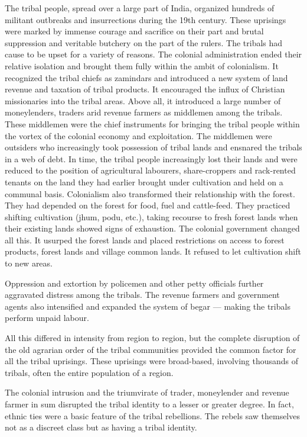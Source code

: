 The tribal people, spread over a large part of India, organized hundreds of militant outbreaks and insurrections during the 19th century. These uprisings were marked by immense courage and sacrifice on their part and brutal suppression and veritable butchery on the part of the rulers. The tribals had cause to be upset for a variety of reasons. The colonial administration ended their relative isolation and brought them fully within the ambit of colonialism. It recognized the tribal chiefs as zamindars and introduced a new system of land revenue and taxation of tribal products. It encouraged the influx of Christian missionaries into the tribal areas. Above all, it introduced a large number of moneylenders, traders arid revenue farmers as middlemen among the tribals. These middlemen were the chief instruments for bringing the tribal people within the vortex of the colonial economy and exploitation. The middlemen were outsiders who increasingly took possession of tribal lands and ensnared the tribals in a web of debt. In time, the tribal people increasingly lost their lands and were reduced to the position of agricultural labourers, share-croppers and rack-rented tenants on the land they had earlier brought under cultivation and held on a communal basis. Colonialism also transformed their relationship with the forest. They had depended on the forest for food, fuel and cattle-feed. They practiced shifting cultivation (jhum, podu, etc.), taking recourse to fresh forest lands when their existing lands showed signs of exhaustion. The colonial government changed all this. It usurped the forest lands and placed restrictions on access to forest products, forest lands and village common lands. It refused to let cultivation shift to new areas.

Oppression and extortion by policemen and other petty officials further aggravated distress among the tribals. The revenue farmers and government agents also intensified and expanded the system of begar — making the tribals perform unpaid labour.

All this differed in intensity from region to region, but the complete disruption of the old agrarian order of the tribal communities provided the common factor for all the tribal uprisings. These uprisings were broad-based, involving thousands of tribals, often the entire population of a region.

The colonial intrusion and the triumvirate of trader, moneylender and revenue farmer in sum disrupted the tribal identity to a lesser or greater degree. In fact, ethnic ties were a basic feature of the tribal rebellions. The rebels saw themselves not as a discreet class but as having a tribal identity.


